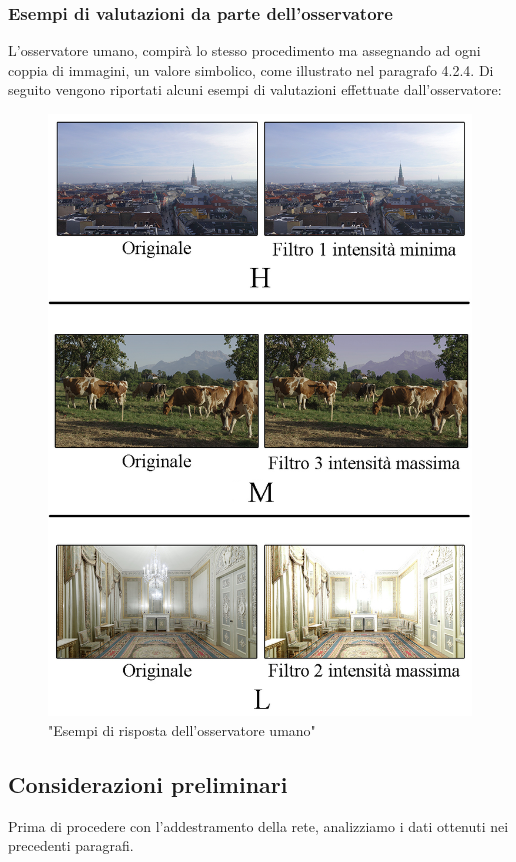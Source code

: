 \documentclass[a4paper,11pt]{article}
\begin{document}
    \subsubsection{Esempi di valutazioni da parte dell'osservatore}
    L'osservatore umano, compirà lo stesso procedimento ma assegnando ad ogni coppia di immagini, un valore simbolico, come illustrato nel paragrafo 4.2.4.
    Di seguito vengono riportati alcuni esempi di valutazioni effettuate dall'osservatore:
    \begin{figure}[h]
        \centering
        \includegraphics[scale=0.3]{confronto.png}
        \caption{"Esempi di risposta dell'osservatore umano"}
    \end{figure}
    \newpage
    \subsection{Considerazioni preliminari}
    Prima di procedere con l'addestramento della rete, analizziamo i dati ottenuti nei precedenti paragrafi. 
\end{document}
